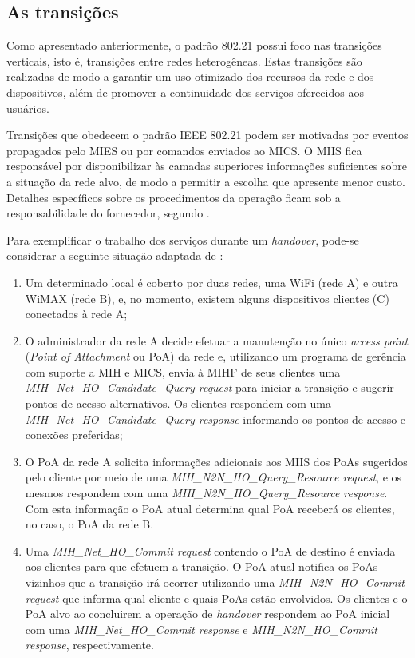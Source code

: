 \documentclass[12pt]{article}
\begin{document}

\subsection{As transições} %

Como apresentado anteriormente, o padrão 802.21 possui foco nas transições 
verticais, isto é, transições entre redes heterogêneas. Estas transições são 
realizadas de modo a garantir um uso otimizado dos recursos da rede e dos 
dispositivos, além de promover a continuidade dos serviços oferecidos aos 
usuários.

Transições que obedecem o padrão IEEE 802.21 podem ser motivadas por eventos 
propagados pelo MIES ou por comandos enviados ao MICS. O MIIS fica responsável 
por disponibilizar às camadas superiores informações suficientes sobre a 
situação da rede alvo, de modo a permitir a escolha que apresente menor custo.  
Detalhes específicos sobre os procedimentos da operação ficam sob a 
responsabilidade do fornecedor, segundo \cite{stein:2006}.

Para exemplificar o trabalho dos serviços durante um \textit{handover}, 
pode-se considerar a seguinte situação adaptada de \cite{kimhun:2010}: 

\begin{enumerate}

	\item Um determinado local é coberto por duas redes, uma WiFi (rede A) 
	e outra WiMAX (rede B), e, no momento, existem alguns dispositivos 
	clientes (C) conectados à rede A;

	\item O administrador da rede A decide efetuar a manutenção no único 
	\textit{access point} (\textit{Point of Attachment} ou PoA) da rede e, 
	utilizando um programa de gerência com suporte a MIH e MICS, envia à 
	MIHF de seus clientes uma \textit{MIH\_Net\_HO\_Candidate\_Query 
	request} para iniciar a transição e sugerir pontos de acesso 
	alternativos. Os clientes respondem com uma 
	\textit{MIH\_Net\_HO\_Candidate\_Query response} informando os pontos 
	de acesso  e conexões preferidas;

	\item O PoA da rede A solicita informações adicionais aos MIIS dos 
	PoAs sugeridos pelo cliente por meio de uma 
	\textit{MIH\_N2N\_HO\_Query\_Resource request}, e os mesmos respondem 
	com uma \textit{MIH\_N2N\_HO\_Query\_Resource response}. Com esta 
	informação o PoA atual determina qual PoA receberá os clientes, no 
	caso, o PoA da rede B.

	\item Uma \textit{MIH\_Net\_HO\_Commit request} contendo o PoA de destino 
	é enviada aos clientes para que efetuem a transição. O PoA atual 
	notifica os PoAs vizinhos que a transição irá ocorrer utilizando uma 
	\textit{MIH\_N2N\_HO\_Commit request} que informa qual cliente e quais 
	PoAs estão envolvidos. Os clientes e o PoA alvo ao concluirem a 
	operação de \textit{handover} respondem ao PoA inicial com uma 
	\textit{MIH\_Net\_HO\_Commit response} e \textit{MIH\_N2N\_HO\_Commit 
	response}, respectivamente.

\end{enumerate}
\end{document}
